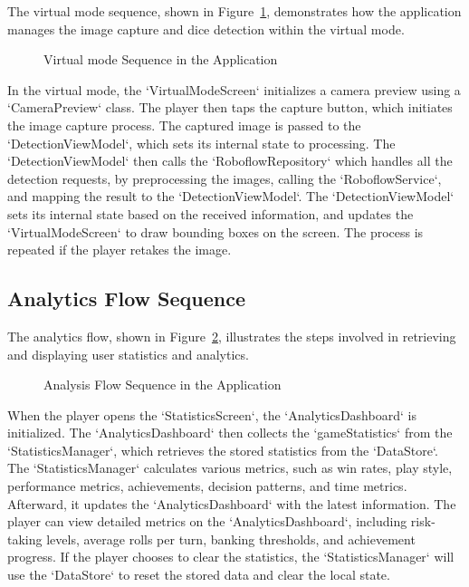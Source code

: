 The virtual mode sequence, shown in Figure~\ref{fig:virtual_mode_flow}, demonstrates how the application manages the image capture and dice detection within the virtual mode.

\begin{figure}[ht!]
    \centering
    
    \caption{Virtual mode Sequence in the Application}
    \label{fig:virtual_mode_flow}
\end{figure}

In the virtual mode, the `VirtualModeScreen` initializes a camera preview using a `CameraPreview` class. The player then taps the capture button, which initiates the image capture process. The captured image is passed to the `DetectionViewModel`, which sets its internal state to processing. The `DetectionViewModel` then calls the `RoboflowRepository` which handles all the detection requests, by preprocessing the images, calling the `RoboflowService`, and mapping the result to the `DetectionViewModel`. The `DetectionViewModel` sets its internal state based on the received information, and updates the `VirtualModeScreen` to draw bounding boxes on the screen. The process is repeated if the player retakes the image.

\subsection{Analytics Flow Sequence}

The analytics flow, shown in Figure~\ref{fig:analysis_flow}, illustrates the steps involved in retrieving and displaying user statistics and analytics.

\begin{figure}[ht!]
    \centering
    
    \caption{Analysis Flow Sequence in the Application}
    \label{fig:analysis_flow}
\end{figure}

When the player opens the `StatisticsScreen`, the `AnalyticsDashboard` is initialized. The `AnalyticsDashboard` then collects the `gameStatistics` from the `StatisticsManager`, which retrieves the stored statistics from the `DataStore`. The `StatisticsManager` calculates various metrics, such as win rates, play style, performance metrics, achievements, decision patterns, and time metrics. Afterward, it updates the `AnalyticsDashboard` with the latest information. The player can view detailed metrics on the `AnalyticsDashboard`, including risk-taking levels, average rolls per turn, banking thresholds, and achievement progress. If the player chooses to clear the statistics, the `StatisticsManager` will use the `DataStore` to reset the stored data and clear the local state.  

